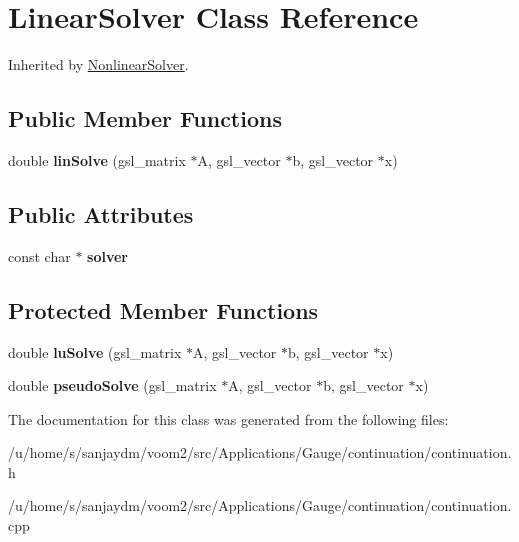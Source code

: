 \hypertarget{class_linear_solver}{
\section{LinearSolver Class Reference}
\label{class_linear_solver}
}


Inherited by \hyperlink{class_nonlinear_solver}{NonlinearSolver}.\subsection*{Public Member Functions}
\begin{DoxyCompactItemize}
\item 
\hypertarget{class_linear_solver_a526918aa29433a77391176dfd709d77a}{
double {\bfseries linSolve} (gsl\_\-matrix $\ast$A, gsl\_\-vector $\ast$b, gsl\_\-vector $\ast$x)}
\label{class_linear_solver_a526918aa29433a77391176dfd709d77a}

\end{DoxyCompactItemize}
\subsection*{Public Attributes}
\begin{DoxyCompactItemize}
\item 
\hypertarget{class_linear_solver_adbaa9d522facd0ae80950342a1a913ba}{
const char $\ast$ {\bfseries solver}}
\label{class_linear_solver_adbaa9d522facd0ae80950342a1a913ba}

\end{DoxyCompactItemize}
\subsection*{Protected Member Functions}
\begin{DoxyCompactItemize}
\item 
\hypertarget{class_linear_solver_ac56a14d70f6f93528cae96670bc62dd5}{
double {\bfseries luSolve} (gsl\_\-matrix $\ast$A, gsl\_\-vector $\ast$b, gsl\_\-vector $\ast$x)}
\label{class_linear_solver_ac56a14d70f6f93528cae96670bc62dd5}

\item 
\hypertarget{class_linear_solver_aa949782efc3d8a104d9ae11074c8f19a}{
double {\bfseries pseudoSolve} (gsl\_\-matrix $\ast$A, gsl\_\-vector $\ast$b, gsl\_\-vector $\ast$x)}
\label{class_linear_solver_aa949782efc3d8a104d9ae11074c8f19a}

\end{DoxyCompactItemize}


The documentation for this class was generated from the following files:\begin{DoxyCompactItemize}
\item 
/u/home/s/sanjaydm/voom2/src/Applications/Gauge/continuation/continuation.h\item 
/u/home/s/sanjaydm/voom2/src/Applications/Gauge/continuation/continuation.cpp\end{DoxyCompactItemize}

